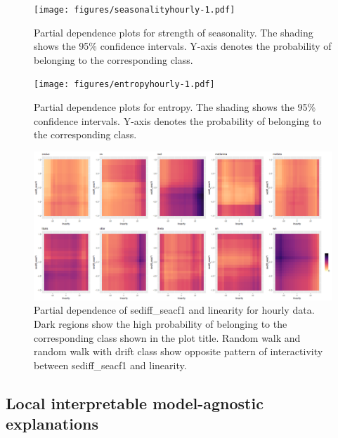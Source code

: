\documentclass[11pt,a4paper,]{article}
\begin{document}
\begin{figure}
\centering
\texttt{[image: figures/seasonalityhourly-1.pdf]}
\caption{\label{fig:seasonalityhourly}Partial dependence plots for strength of seasonality. The shading shows the 95\% confidence intervals. Y-axis denotes the probability of belonging to the corresponding class.}
\end{figure}

\begin{figure}
\centering
\texttt{[image: figures/entropyhourly-1.pdf]}
\caption{\label{fig:entropyhourly}Partial dependence plots for entropy. The shading shows the 95\% confidence intervals. Y-axis denotes the probability of belonging to the corresponding class.}
\end{figure}

\begin{figure}
\centering
\includegraphics{figures/htwopdp-1.png}
\caption{\label{fig:htwopdp}Partial dependence of sediff\_seacf1 and linearity for hourly data. Dark regions show the high probability of belonging to the corresponding class shown in the plot title. Random walk and random walk with drift class show opposite pattern of interactivity between sediff\_seacf1 and linearity.}
\end{figure}

\hypertarget{local-interpretable-model-agnostic-explanations}{%
\subsection{Local interpretable model-agnostic explanations}\label{local-interpretable-model-agnostic-explanations}}
\end{document}
